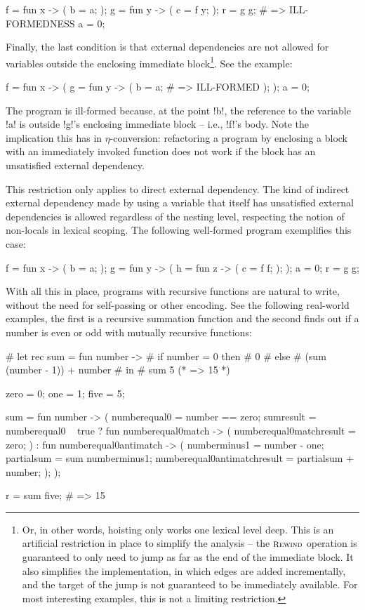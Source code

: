 \documentclass[nocopyright]{sigplanconf}
\begin{document}
\begin{plang}
f = fun x -> (
  b = a;
);
g = fun y -> (
  c = f y;
);
r = g g; # => ILL-FORMEDNESS
a = 0;
\end{plang}

Finally, the last condition is that external dependencies are not allowed for variables outside the enclosing immediate block\footnote{Or, in other words, hoisting only works one lexical level deep.  This is an artificial restriction in place to simplify the analysis -- the $\krewind$ operation is guaranteed to only need to jump as far as the end of the immediate block.  It also simplifies the implementation, in which edges are added incrementally, and the target of the jump is not guaranteed to be immediately available.  For most interesting examples, this is not a limiting restriction.}. See the example:

\begin{plang}
f = fun x -> (
  g = fun y -> (
    b = a; # => ILL-FORMED
  );
);
a = 0;
\end{plang}

The program is ill-formed because, at the point \plangil!b!, the reference to the variable \plangil!a! is outside \plangil!g!'s enclosing immediate block -- i.e., \plangil!f!'s body.  Note the implication this has in $\eta$-conversion: refactoring a program by enclosing a block with an immediately invoked function does not work if the block has an unsatisfied external dependency.

This restriction only applies to direct external dependency.  The kind of indirect external dependency made by using a variable that itself has unsatisfied external dependencies is allowed regardless of the nesting level, respecting the notion of non-locals in lexical scoping.  The following well-formed program exemplifies this case:

\begin{plang}
f = fun x -> (
  b = a;
);
g = fun y -> (
  h = fun z -> (
    c = f f;
  );
);
a = 0;
r = g g;
\end{plang}

With all this in place, programs with recursive functions are natural to write, without the need for self-passing or other encoding.  See the following real-world examples, the first is a recursive summation function and the second finds out if a number is even or odd with mutually recursive functions:

\begin{plang}
# let rec sum = fun number ->
#   if number = 0 then
#     0
#   else
#     (sum (number - 1)) + number
# in
# sum 5 (* => 15 *)

zero = 0;
one = 1;
five = 5;

sum = fun number -> (
  numberequal0 = number == zero;
  sumresult = numberequal0 ~ true
    ? fun numberequal0match -> (
      numberequal0matchresult = zero;
    )
    : fun numberequal0antimatch -> (
      numberminus1 = number - one;
      partialsum = sum numberminus1;
      numberequal0antimatchresult = partialsum + number;
    );
);

r = sum five; # => 15
\end{plang}
\end{document}
